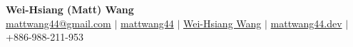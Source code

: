 \documentclass[letterpaper,11pt]{article}
\begin{document}

\begin{center}
  \textbf{\Large Wei-Hsiang (Matt) Wang} \\
  \vspace{8px}
  \href{mailto:mattwang44@gmail.com}{\faEnvelope \hspace{1px} mattwang44@gmail.com} {{$\vert$}}
  \href{https://github.com/mattwang44/}{\faGithub \hspace{1px} mattwang44} {{$\vert$}}
  \href{https://www.linkedin.com/in/weihsiang-wang/}{\faLinkedin \hspace{1px} Wei-Hsiang Wang} {{$\vert$}}
  \href{https://mattwang44.dev/}{ \faPenSquare \hspace{1px} mattwang44.dev} {{$\vert$}}
  { \faPhoneSquare \hspace{1px} +886-988-211-953}
\end{center}

\vspace{-8px}
\end{document}
